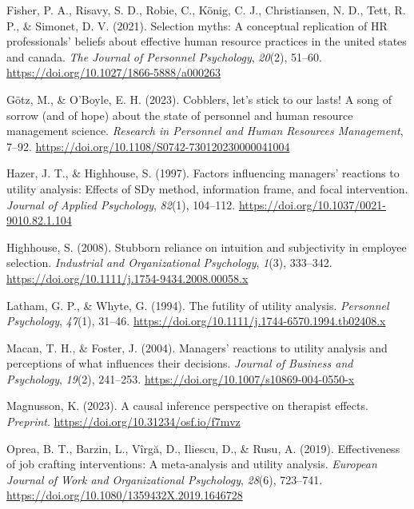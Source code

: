\documentclass[
  english,
  man]{apa6}
\newlength{\cslhangindent}
\newenvironment{CSLReferences}[2] %
 {\begin{list}{}{%
  \setlength{\itemindent}{0pt}
  \setlength{\leftmargin}{0pt}
  \setlength{\parsep}{0pt}
  \ifodd #1
   \setlength{\leftmargin}{\cslhangindent}
   \setlength{\itemindent}{-1\cslhangindent}
  \fi
  \setlength{\itemsep}{#2\baselineskip}}}
 {\end{list}}
\begin{document}
\begin{CSLReferences}{1}{0}
Fisher, P. A., Risavy, S. D., Robie, C., König, C. J., Christiansen, N. D., Tett, R. P., \& Simonet, D. V. (2021). Selection myths: A conceptual replication of HR professionals' beliefs about effective human resource practices in the united states and canada. \emph{The Journal of Personnel Psychology}, \emph{20}(2), 51--60. \url{https://doi.org/10.1027/1866-5888/a000263}

Götz, M., \& O'Boyle, E. H. (2023). Cobblers, let's stick to our lasts! A song of sorrow (and of hope) about the state of personnel and human resource management science. \emph{Research in Personnel and Human Resources Management}, 7--92. \url{https://doi.org/10.1108/S0742-730120230000041004}

Hazer, J. T., \& Highhouse, S. (1997). Factors influencing managers' reactions to utility analysis: Effects of SDy method, information frame, and focal intervention. \emph{Journal of Applied Psychology}, \emph{82}(1), 104--112. \url{https://doi.org/10.1037/0021-9010.82.1.104}

Highhouse, S. (2008). Stubborn reliance on intuition and subjectivity in employee selection. \emph{Industrial and Organizational Psychology}, \emph{1}(3), 333--342. \url{https://doi.org/10.1111/j.1754-9434.2008.00058.x}

Latham, G. P., \& Whyte, G. (1994). The futility of utility analysis. \emph{Personnel Psychology}, \emph{47}(1), 31--46. \url{https://doi.org/10.1111/j.1744-6570.1994.tb02408.x}

Macan, T. H., \& Foster, J. (2004). Managers' reactions to utility analysis and perceptions of what influences their decisions. \emph{Journal of Business and Psychology}, \emph{19}(2), 241--253. \url{https://doi.org/10.1007/s10869-004-0550-x}

Magnusson, K. (2023). A causal inference perspective on therapist effects. \emph{Preprint}. \url{https://doi.org/10.31234/osf.io/f7mvz}

Oprea, B. T., Barzin, L., Vîrgă, D., Iliescu, D., \& Rusu, A. (2019). Effectiveness of job crafting interventions: A meta-analysis and utility analysis. \emph{European Journal of Work and Organizational Psychology}, \emph{28}(6), 723--741. \url{https://doi.org/10.1080/1359432X.2019.1646728}


\end{CSLReferences}
\end{document}
